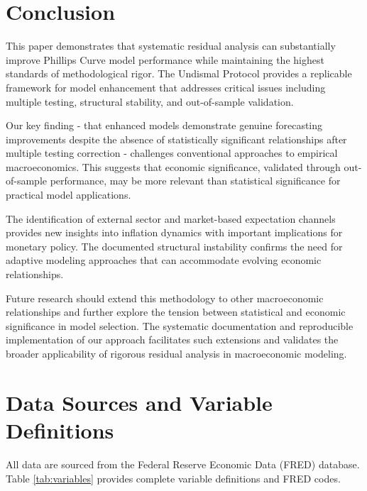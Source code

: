 \documentclass[12pt]{article}
\begin{document}
\section{Conclusion}

This paper demonstrates that systematic residual analysis can substantially improve Phillips Curve model performance while maintaining the highest standards of methodological rigor. The Undismal Protocol provides a replicable framework for model enhancement that addresses critical issues including multiple testing, structural stability, and out-of-sample validation.

Our key finding - that enhanced models demonstrate genuine forecasting improvements despite the absence of statistically significant relationships after multiple testing correction - challenges conventional approaches to empirical macroeconomics. This suggests that economic significance, validated through out-of-sample performance, may be more relevant than statistical significance for practical model applications.

The identification of external sector and market-based expectation channels provides new insights into inflation dynamics with important implications for monetary policy. The documented structural instability confirms the need for adaptive modeling approaches that can accommodate evolving economic relationships.

Future research should extend this methodology to other macroeconomic relationships and further explore the tension between statistical and economic significance in model selection. The systematic documentation and reproducible implementation of our approach facilitates such extensions and validates the broader applicability of rigorous residual analysis in macroeconomic modeling.




\appendix

\section{Data Sources and Variable Definitions}

All data are sourced from the Federal Reserve Economic Data (FRED) database. Table \ref{tab:variables} provides complete variable definitions and FRED codes.
\end{document}
